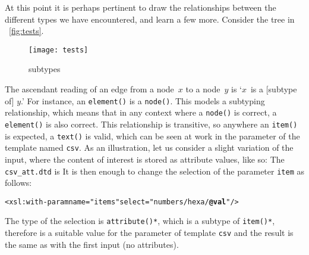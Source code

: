At this point it is perhaps pertinent to draw the relationships
between the different types we have encountered, and learn a few
more. Consider the tree in \fig~\vref{fig:tests}.
\begin{figure}
\centering
\texttt{[image: tests]}
\caption{\XPath subtypes}
\label{fig:tests}
\end{figure}
The ascendant reading of an edge from a node~\(x\) to a node~\(y\) is
`\(x\)~is a [subtype of] \(y\).' For instance, an \texttt{element()}
is a \texttt{node()}. This models a subtyping relationship, which
means that in any context where a \texttt{node()} is correct, a
\texttt{element()} is also correct. This relationship is transitive,
so anywhere an \texttt{item()} is expected, a \texttt{text()} is
valid, which can be seen at work in the parameter of the template
named \texttt{csv}. As an illustration, let us consider a slight
variation of the input, where the content of interest is stored as
attribute values, like so:
\noindent The \DTD \texttt{csv\_att.dtd} is
\noindent It is then enough to change the selection of the parameter
\texttt{item} as follows:
\begin{alltt}
      <xsl:with-param name="items" select="numbers/hexa/\textbf{@val}"/>
\end{alltt}
The type of the selection is \texttt{attribute()*}, which is a
subtype of \texttt{item()*}, therefore is a suitable value for the
parameter of template \texttt{csv} and the result is the same as with
the first \XML input (no attributes).

